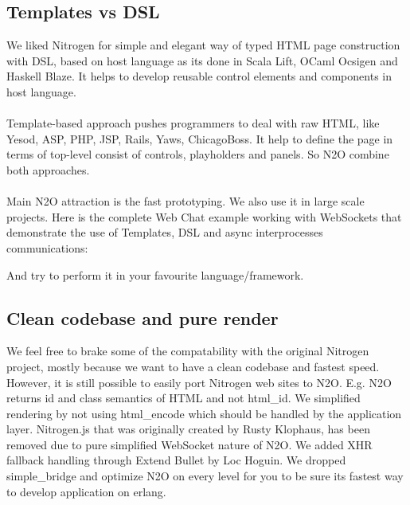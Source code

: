 \documentclass[11pt]{article}
\begin{document}
\subsection*{Templates vs DSL}
We liked Nitrogen for simple and elegant way of typed HTML page
construction with DSL, based on host language as its done in Scala Lift,
OCaml Ocsigen and Haskell Blaze. It helps to develop reusable control
elements and components in host language.
\paragraph{}
Template-based approach pushes programmers to deal with raw HTML,
like Yesod, ASP, PHP, JSP, Rails, Yaws, ChicagoBoss. It help to
define the page in terms of top-level consist of controls, playholders
and panels. So N2O combine both approaches.
\paragraph{}
Main N2O attraction is the fast prototyping. We also use it in large
scale projects. Here is the complete Web Chat example working with
WebSockets that demonstrate the use of Templates, DSL and async
interprocesses communications:


And try to perform it in your favourite language/framework.

\subsection*{Clean codebase and pure render}
We feel free to brake some of the compatability with the original
Nitrogen project, mostly because we want to have a clean codebase
and fastest speed. However, it is still possible to easily port
Nitrogen web sites to N2O. E.g. N2O returns id and class semantics
of HTML and not html_id. We simplified rendering by not using
html_encode which should be handled by the application layer.
Nitrogen.js that was originally created by Rusty Klophaus,
has been removed due to pure simplified WebSocket nature of N2O.
We added XHR fallback handling through Extend Bullet by Loc Hoguin.
We dropped simple_bridge and optimize N2O on every level for you
to be sure its fastest way to develop application on erlang.








\end{document}
